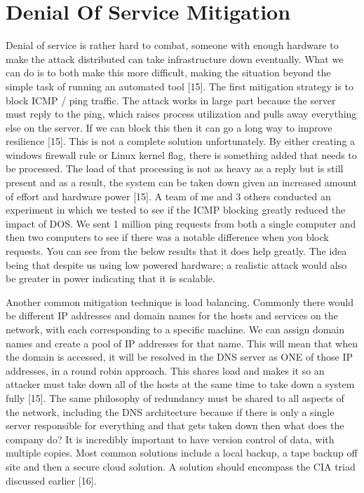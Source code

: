 \section {Denial Of Service Mitigation}
Denial of service is rather hard to combat, someone with enough hardware to make the attack distributed can take infrastructure down eventually. What we can do is to both make this more difficult, making the situation beyond the simple task of running an automated tool [15]. 
The first mitigation strategy is to block ICMP / ping traffic. The attack works in large part because the server must reply to the ping, which raises process utilization and pulls away everything else on the server. If we can block this then it can go a long way to improve resilience [15].
This is not a complete solution unfortunately. By either creating a windows firewall rule or Linux kernel flag, there is something added that needs to be processed. The load of that processing is not as heavy as a reply but is still present and as a result, the system can be taken down given an increased amount of effort and hardware power [15].
A team of me and 3 others conducted an experiment in which we tested to see if the ICMP blocking greatly reduced the impact of DOS. We sent 1 million ping requests from both a single computer and then two computers to see if there was a notable difference when you block requests. You can see from the below results that it does help greatly. The idea being that despite us using low powered hardware; a realistic attack would also be greater in power indicating that it is scalable.


Another common mitigation technique is load balancing. Commonly there would be different IP addresses and domain names for the hosts and services on the network, with each corresponding to a specific machine. We can assign domain names and create a pool of IP addresses for that name. This will mean that when the domain is accessed, it will be resolved in the DNS server as ONE of those IP addresses, in a round robin approach. This shares load and makes it so an attacker must take down all of the hosts at the same time to take down a system fully [15].
The same philosophy of redundancy must be shared to all aspects of the network, including the DNS architecture because if there is only a single server responsible for everything and that gets taken down then what does the company do? It is incredibly important to have version control of data, with multiple copies. Most common solutions include a local backup, a tape backup off site and then a secure cloud solution. A solution should encompass the CIA triad discussed earlier [16].

